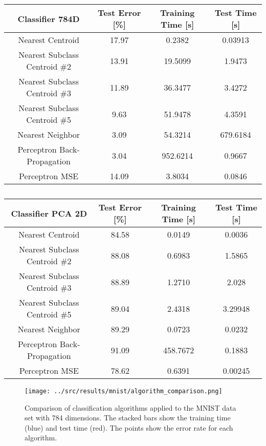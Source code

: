 \begin{table}[H]
    \small
    \begin{tabulary}{\linewidth}{CCCC}
    \toprule
    \textbf{Classifier 784D} & \textbf{Test Error [\%]} & \textbf{Training Time [s]} & \textbf{Test Time [s]}  \\
    \midrule
    Nearest Centroid  & 17.97 & 0.2382 & 0.03913  \\ \hline
    Nearest Subclass Centroid \#2 & 13.91 & 19.5099 & 1.9473   \\ \hline
    Nearest Subclass Centroid \#3 & 11.89 & 36.3477 & 3.4272   \\ \hline 
    Nearest Subclass Centroid \#5 & 9.63 & 51.9478 & 4.3591   \\ \hline 
    Nearest Neighbor & 3.09 & 54.3214 & 679.6184  \\ \hline 
    Perceptron Back-Propagation & 3.04 & 952.6214 &  0.9667   \\ \hline 
    Perceptron MSE & 14.09 & 3.8034 & 0.0846 \\ 
    \bottomrule
\end{tabulary}
\caption{}
    \label{tab:mnist}
    \end{table}

    \begin{table}[H]
        \small
        \begin{tabulary}{\linewidth}{CCCC}
    \toprule
    \textbf{Classifier PCA 2D}& \textbf{Test Error [\%]} & \textbf{Training Time [s]} & \textbf{Test Time [s]}  \\
    \midrule
    Nearest Centroid  & 84.58 & 0.0149 & 0.0036  \\ \hline
    Nearest Subclass Centroid \#2 &  88.08 & 0.6983 & 1.5865   \\ \hline
    Nearest Subclass Centroid \#3 & 88.89 & 1.2710 & 2.028   \\ \hline 
    Nearest Subclass Centroid \#5 & 89.04 & 2.4318 & 3.29948   \\ \hline 
    Nearest Neighbor & 89.29 & 0.0723 & 0.0232  \\ \hline 
    Perceptron Back-Propagation & 91.09 & 458.7672 &  0.1883   \\ \hline 
    Perceptron MSE & 78.62 & 0.6391 & 0.00245 \\ 
    \bottomrule
    \end{tabulary}
    \caption{}
    \label{tab:mnist_2d}
\end{table}

\begin{figure}[H]
    \texttt{[image: ../src/results/mnist/algorithm\_comparison.png]}
    \caption{Comparison of classification algorithms applied to the MNIST data set with 784 dimensions. The stacked bars show the training time (blue) and test time (red). The points show the error rate for each algorithm.}
    \label{fig:comparison_mnist_784d}
\end{figure}


